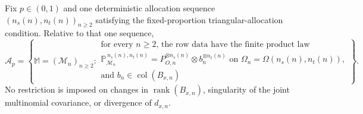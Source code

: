 Fix \(p\in(0,1)\) and one deterministic allocation sequence \((n_s(n),n_t(n))_{n\ge2}\) satisfying the fixed-proportion triangular-allocation condition. Relative to that one sequence,
\[
\mathcal A_p=\left\{\mathbb M=(\mathcal M_n)_{n\ge2}:\begin{array}{l}
\text{for every \(n\ge2\), the row data have the finite product law }\\
\mathbb P_{\mathcal M_n}^{\,n_s(n),n_t(n)}=P_{O,n}^{\otimes n_s(n)}\otimes b_n^{\otimes n_t(n)}
\text{ on }\Omega_n=\Omega(n_s(n),n_t(n)),\\
\text{and }b_n\in\operatorname{col}(B_{x,n})
\end{array}\right\}.
\]
No restriction is imposed on changes in \(\operatorname{rank}(B_{x,n})\), singularity of the joint multinomial covariance, or divergence of \(d_{x,n}\).
